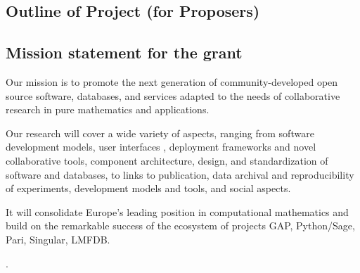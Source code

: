 \begin{draft}
\red

\section*{Outline of Project (for Proposers)}


\subsection*{Mission statement for the grant}

Our mission is to promote the next generation of community-developed
open source software, databases, and services adapted to the needs of
collaborative research in pure mathematics and applications.

Our research will cover a wide variety of aspects, ranging from
software development models, user interfaces , deployment frameworks and novel collaborative tools,
component architecture, design, and standardization of software
 and databases, to links to publication, data archival
and reproducibility of experiments, development models and tools, and
social aspects.

It will consolidate Europe's leading position in computational
mathematics and build on the remarkable success of the ecosystem of
projects GAP, Python/Sage, Pari, Singular, LMFDB.


.

\renewcommand{\thepage}{\arabic{page}}
\setcounter{page}{1}
\black
\cleardoublepage
\end{draft}
